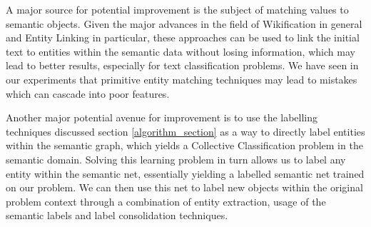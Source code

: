 \documentclass[twoside,11pt]{article}
\theoremstyle{definition}
\begin{document}
A major source for potential improvement is the subject of matching values to semantic objects. Given the major advances in the field of Wikification \cite{bunescu2006using} in general and Entity Linking \cite{rao2013entity} in particular, these approaches can be used to link the initial text to entities within the semantic data without losing information, which may lead to better results, especially for text classification problems. We have seen in our experiments that primitive entity matching techniques may lead to mistakes which can cascade into poor features.

Another major potential avenue for improvement is to use the labelling techniques discussed section \ref{algorithm_section} as a way to directly label entities within the semantic graph, which yields a Collective Classification \cite{kajdanowicz2013collective} problem in the semantic domain. Solving this learning problem in turn allows us to label any entity within the semantic net, essentially yielding a labelled semantic net trained on our problem. We can then use this net to label new objects within the original problem context through a combination of entity extraction, usage of the semantic labels and label consolidation techniques.

\vskip 0.2in


%
%
\end{document}
